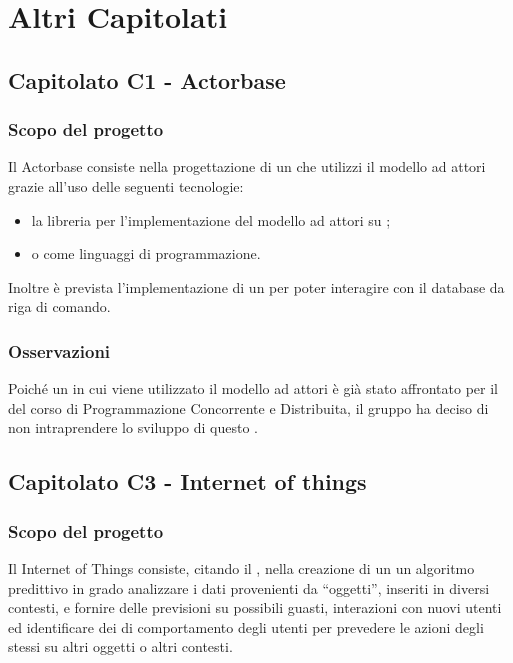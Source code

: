 \section{Altri Capitolati}

\subsection{Capitolato C1 - Actorbase}
\subsubsection{Scopo del progetto}

Il  Actorbase consiste nella progettazione di un  che utilizzi il modello ad attori grazie all'uso delle seguenti tecnologie:
\begin{itemize}
	\item la libreria  per l'implementazione del modello ad attori su ;
	\item {} o  come linguaggi di programmazione.
\end{itemize}
Inoltre è prevista l'implementazione di un  per poter interagire con il database da riga di comando.

\subsubsection{Osservazioni}
Poiché un  in cui viene utilizzato il modello ad attori è già stato affrontato per il  del corso di Programmazione Concorrente e Distribuita, il gruppo ha deciso di non intraprendere lo sviluppo di questo .


\subsection{Capitolato C3 - Internet of things}
\subsubsection{Scopo del progetto}

Il  Internet of Things consiste, citando il , nella creazione di un un algoritmo predittivo in grado analizzare i dati provenienti da “oggetti”, inseriti in diversi contesti, e fornire delle previsioni su possibili guasti, interazioni con nuovi utenti ed identificare dei  di comportamento degli utenti per prevedere le azioni degli stessi su altri oggetti o altri contesti.

